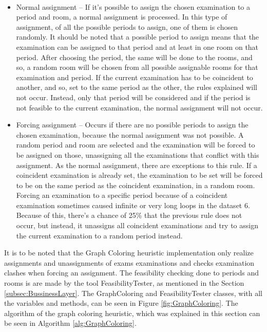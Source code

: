 \\
\begin{itemize}
	\item Normal assignment -- If it's possible to assign the chosen examination to a period and room, a normal assignment is processed. In this type of assignment, of all the possible periods to assign, one of them is chosen randomly. It should be noted that a possible period to assign means that the examination can be assigned to that period and at least in one room on that period. After choosing the period, the same will be done to the rooms, and so, a random room will be chosen from all possible assignable rooms for that examination and period. If the current examination has to be coincident to another, and so, set to the same period as the other, the rules explained will not occur. Instead, only that period will be considered and if the period is not feasible to the current examination, the normal assignment will not occur. \\
	\item Forcing assignment -- Occurs if there are no possible periods to assign the chosen examination, because the normal assignment was not possible. A random period and room are selected and the examination will be forced to be assigned on those, unassigning all the examinations that conflict with this assignment. As the normal assignment, there are exceptions to this rule. If a coincident examination is already set, the examination to be set will be forced to be on the same period as the coincident examination, in a random room. Forcing an examination to a specific period because of a coincident examination sometimes caused infinite or very long loops in the dataset 6. Because of this, there's a chance of 25\% that the previous rule does not occur, but instead, it unassigns all coincident examinations and try to assign the current examination to a random period instead.
\end{itemize}
It is to be noted that the Graph Coloring heuristic implementation only realize assignments and unassignments of exams examinations and checks examination clashes when forcing an assignment. The feasibility checking done to periods and rooms is are made by the tool FeasibilityTester, as mentioned in the Section \ref{subsec:BussinessLayer}. The GraphColoring and FeasibilityTester classes, with all the variables and methods, can be seen in Figure \ref{fig:GraphColoring}. The algorithm of the graph coloring heuristic, which was explained in this section can be seen in Algorithm \ref{alg:GraphColoring}.\\


